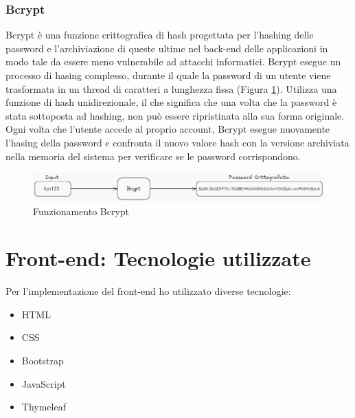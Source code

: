 \subsubsection{Bcrypt}
Bcrypt è una funzione crittografica di hash progettata per l'hashing delle password e l'archiviazione di queste ultime nel back-end delle applicazioni in modo tale da essere meno vulnerabile ad attacchi informatici.
Bcrypt esegue un processo di hasing complesso, durante il quale la password di un utente viene trasformata in un thread di caratteri a lunghezza fissa (Figura \ref{fig:bcrypt}).
Utilizza una funzione di hash unidirezionale, il che significa che una volta che la password è stata sottoposta ad hashing, non può essere ripristinata alla sua forma originale. Ogni volta che l'utente accede al proprio account, Bcrypt esegue nuovamente l'hasing della password e confronta il nuovo valore hash con la versione archiviata nella memoria del sistema per verificare se le password corrispondono. \cite{bcrypt}
\\
\begin{figure}[h]
    \centering
    \includegraphics[width=1.0\textwidth]{images/Bcrypt.png}
    \caption{Funzionamento Bcrypt}
    \label{fig:bcrypt}
\end{figure}


\newpage
\section{Front-end: Tecnologie utilizzate}
Per l'implementazione del front-end ho utilizzato diverse tecnologie:
\begin{itemize}
    \item HTML
    \item CSS
    \item Bootstrap
    \item JavaScript
    \item Thymeleaf
\end{itemize}

